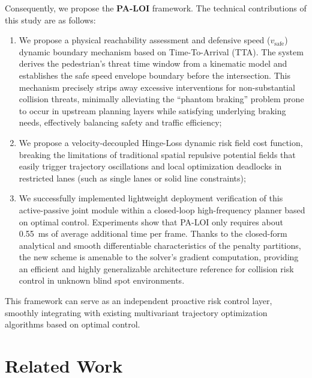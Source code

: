 \documentclass[letterpaper, 10 pt, conference]{ieeeconf}  %
\begin{document}
Consequently, we propose the \textbf{PA-LOI} framework. The technical contributions of this study are as follows:
\begin{enumerate}
    \item We propose a physical reachability assessment and defensive speed ($v_{\text{safe}}$) dynamic boundary mechanism based on Time-To-Arrival (TTA). The system derives the pedestrian's threat time window from a kinematic model and establishes the safe speed envelope boundary before the intersection. This mechanism precisely strips away excessive interventions for non-substantial collision threats, minimally alleviating the ``phantom braking'' problem prone to occur in upstream planning layers while satisfying underlying braking needs, effectively balancing safety and traffic efficiency;
    \item We propose a velocity-decoupled Hinge-Loss dynamic risk field cost function, breaking the limitations of traditional spatial repulsive potential fields that easily trigger trajectory oscillations and local optimization deadlocks in restricted lanes (such as single lanes or solid line constraints);
    \item We successfully implemented lightweight deployment verification of this active-passive joint module within a closed-loop high-frequency planner based on optimal control. Experiments show that PA-LOI only requires about \SI{0.55}{\milli\second} of average additional time per frame. Thanks to the closed-form analytical and smooth differentiable characteristics of the penalty partitions, the new scheme is amenable to the solver's gradient computation, providing an efficient and highly generalizable architecture reference for collision risk control in unknown blind spot environments.
\end{enumerate}

This framework can serve as an independent proactive risk control layer, smoothly integrating with existing multivariant trajectory optimization algorithms based on optimal control.

\section{Related Work}
\end{document}
